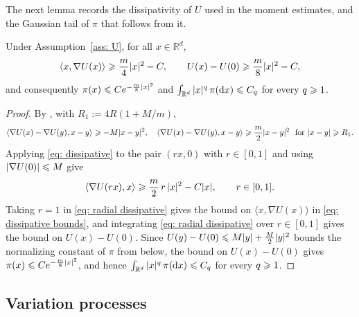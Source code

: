 The next lemma records the dissipativity of $U$ used in the moment estimates, and the Gaussian tail of $\pi$ that follows from it.

\begin{lemma}
\label{lem: dissipative}
    Under Assumption~\ref{ass: U}, for all $x \in \mathbb R^d$,
    \begin{equation}
        \langle x, \nabla U(x) \rangle \geqslant \frac{m}{4} |x|^2 - C , \qquad U(x) - U(0) \geqslant \frac{m}{8} |x|^2 - C ,
        \label{eq: dissipative bounds}
    \end{equation}
    and consequently $\pi(x) \leqslant C e^{-\frac{m}{8}|x|^2}$ and $\int_{\mathbb R^d} |x|^q\, \pi(\mathrm{d} x) \leqslant C_q$ for every $q \geqslant 1$.
\end{lemma}

\begin{proof}
    By \citep[Lemma~4]{ye2026mse}, with $R_1 := 4R(1+M/m)$,
    \begin{equation}
        \langle \nabla U(x) - \nabla U(y), x-y \rangle \geqslant -M |x-y|^2 , \quad
        \langle \nabla U(x) - \nabla U(y), x-y \rangle \geqslant \frac{m}{2} |x-y|^2 \ \text{ for } |x-y| \geqslant R_1 .
        \label{eq: dissipative}
    \end{equation}
    Applying \eqref{eq: dissipative} to the pair $(rx,0)$ with $r \in [0,1]$ and using $|\nabla U(0)| \leqslant M$ give
    \begin{equation}
        \langle \nabla U(rx), x \rangle \geqslant \frac m2\, r\, |x|^2 - C |x| , \qquad r \in [0,1] .
        \label{eq: radial dissipative}
    \end{equation}
    Taking $r = 1$ in \eqref{eq: radial dissipative} gives the bound on $\langle x, \nabla U(x) \rangle$ in \eqref{eq: dissipative bounds}, and integrating \eqref{eq: radial dissipative} over $r \in [0,1]$ gives the bound on $U(x) - U(0)$. Since $U(y) - U(0) \leqslant M|y| + \frac{M}{2}|y|^2$ bounds the normalizing constant of $\pi$ from below, the bound on $U(x) - U(0)$ gives $\pi(x) \leqslant C e^{-\frac m8 |x|^2}$, and hence $\int_{\mathbb R^d} |x|^q\, \pi(\mathrm{d} x) \leqslant C_q$ for every $q \geqslant 1$.
\end{proof}

\subsection{Variation processes}
\label{sec: variations}

